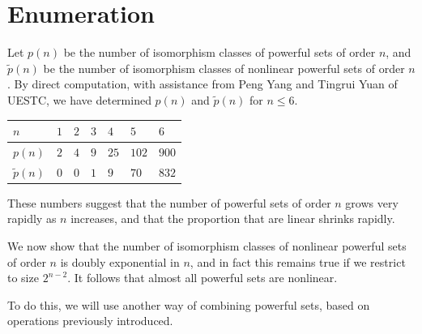 \documentclass[12pt]{article}
\begin{document}
\section{Enumeration}
\label{sec:enumeration}

Let $p(n)$ be the number of isomorphism classes
of powerful sets of order $n$, and $\tilde{p}(n)$ be the number of isomorphism classes of nonlinear powerful sets of order $n$. By direct computation, with assistance from Peng Yang and Tingrui Yuan of UESTC, we have determined $p(n)$ and $\tilde{p}(n)$ for $n\le6$.
\begin{center}
{\renewcommand{\arraystretch}{1.3}
\begin{tabular}{|m{1.5cm}<{\centering}||m{1cm}<{\centering}|m{1cm}<{\centering}|m{1cm}<{\centering}|m{1cm}<{\centering}|m{1cm}<{\centering}|m{1cm}<{\centering}|}\hline
$n$      &$1$  &$2$  &$3$  &$4$ &$5$ &$6$ \\ \hline\hline
$p(n)$   &$2$  &$4$  &$9$  &$25$  &$102$ &$900$\\ \hline
$\tilde{p}(n)$  &$0$  &$0$  &$1$  &$9$   &$70$  &$832$ \\ \hline
\end{tabular}}%
\end{center}

These numbers suggest that the number of powerful sets of order $n$ grows very rapidly
as $n$ increases, and that the proportion that are linear shrinks rapidly.

We now show that the number of isomorphism classes of nonlinear
powerful sets of order $n$ is doubly exponential in $n$, and
in fact this remains true if we restrict to size $2^{n-2}$.
It follows that almost all powerful sets are nonlinear.

To do this, we will use another way of combining powerful sets, based on operations
previously introduced.
\end{document}
